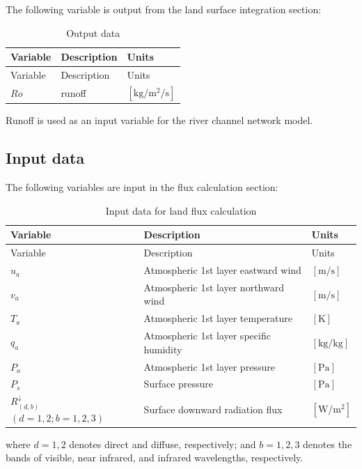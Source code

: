 The following variable is output from the land surface integration section:

\begin{longtable}[]{@{}lll@{}}
\caption{Output data}\tabularnewline
\toprule\noalign{}
Variable & Description & Units \\
\midrule\noalign{}
\endfirsthead
\toprule\noalign{}
Variable & Description & Units \\
\midrule\noalign{}
\endhead
\bottomrule\noalign{}
\endlastfoot
\(Ro\) & runoff & \(\mathrm{[kg/m^2/s]}\) \\
\end{longtable}

Runoff is used as an input variable for the river channel network model.

\subsection{Input data}\label{input-data}

The following variables are input in the flux calculation section:

\begin{longtable}[]{@{}lll@{}}
\caption{Input data for land flux calculation}\tabularnewline
\toprule\noalign{}
Variable & Description & Units \\
\midrule\noalign{}
\endfirsthead
\toprule\noalign{}
Variable & Description & Units \\
\midrule\noalign{}
\endhead
\bottomrule\noalign{}
\endlastfoot
\(u_a\) & Atmospheric 1st layer eastward wind & \(\mathrm{[m/s]}\) \\
\(v_a\) & Atmospheric 1st layer northward wind & \(\mathrm{[m/s]}\) \\
\(T_a\) & Atmospheric 1st layer temperature & \(\mathrm{[K]}\) \\
\(q_a\) & Atmospheric 1st layer specific humidity & \(\mathrm{[kg/kg]}\) \\
\(P_a\) & Atmospheric 1st layer pressure & \(\mathrm{[Pa]}\) \\
\(P_s\) & Surface pressure & \(\mathrm{[Pa]}\) \\
\(R^{\downarrow}_{(d,b)}\) \((d=1,2;b=1,2,3)\) & Surface downward radiation flux & \(\mathrm{[W/m^2]}\) \\
\end{longtable}

where \(d=1,2\) denotes direct and diffuse, respectively; and \(b=1,2,3\) denotes the bands of visible, near infrared, and infrared wavelengths, respectively.

